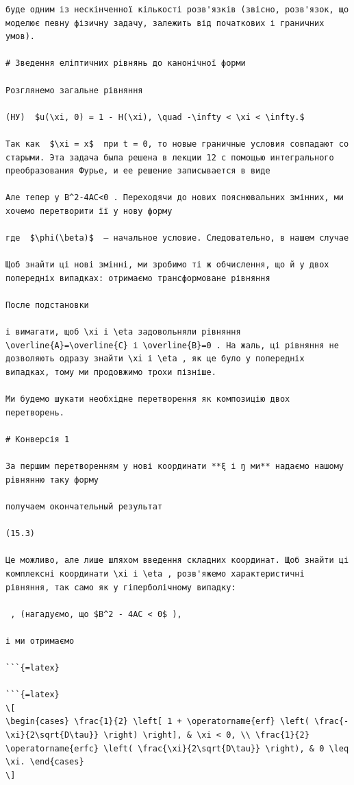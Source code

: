 \documentclass[
  ukrainian,
]{article}
\begin{document}
\begin{verbatim}
буде одним із нескінченної кількості розв'язків (звісно, розв'язок, що моделює певну фізичну задачу, залежить від початкових і граничних умов).

# Зведення еліптичних рівнянь до канонічної форми

Розглянемо загальне рівняння

(НУ)  $u(\xi, 0) = 1 - H(\xi), \quad -\infty < \xi < \infty.$ 

Так как  $\xi = x$  при t = 0, то новые граничные условия совпадают со старыми. Эта задача была решена в лекции 12 с помощью интегрального преобразования Фурье, и ее решение записывается в виде

Але тепер у B^2-4AC<0 . Переходячи до нових пояснювальних змінних, ми хочемо перетворити її у нову форму

где  $\phi(\beta)$  — начальное условие. Следовательно, в нашем случае

Щоб знайти ці нові змінні, ми зробимо ті ж обчислення, що й у двох попередніх випадках: отримаємо трансформоване рівняння

После подстановки

і вимагати, щоб \xi і \eta задовольняли рівняння \overline{A}=\overline{C} і \overline{B}=0 . На жаль, ці рівняння не дозволяють одразу знайти \xi і \eta , як це було у попередніх випадках, тому ми продовжимо трохи пізніше.

Ми будемо шукати необхідне перетворення як композицію двох перетворень.

# Конверсія 1

За першим перетворенням у нові координати **ξ і ŋ ми** надаємо нашому рівнянню таку форму

получаем окончательный результат

(15.3)

Це можливо, але лише шляхом введення складних координат. Щоб знайти ці комплексні координати \xi і \eta , розв'яжемо характеристичні рівняння, так само як у гіперболічному випадку:

 , (нагадуємо, що $B^2 - 4AC < 0$ ),

і ми отримаємо

```{=latex}

```{=latex}
\[
\begin{cases} \frac{1}{2} \left[ 1 + \operatorname{erf} \left( \frac{-\xi}{2\sqrt{D\tau}} \right) \right], & \xi < 0, \\ \frac{1}{2} \operatorname{erfc} \left( \frac{\xi}{2\sqrt{D\tau}} \right), & 0 \leq \xi. \end{cases}
\]
\end{verbatim}
\end{document}
